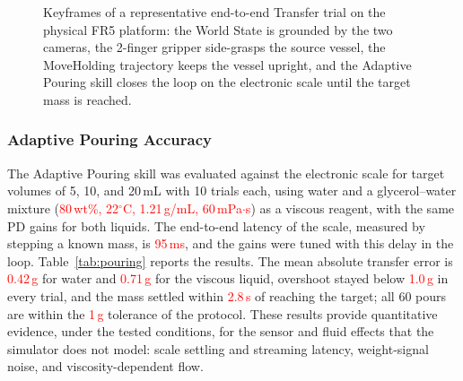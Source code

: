 \documentclass{ieeeaccess}
\newif\ifhighlight
\newcommand{\rev}[1]{\ifhighlight\hl{#1}\else#1\fi}
\newcommand{\nd}[1]{\textcolor{red}{#1}}
\newcommand{\revbox}[1]{\ifhighlight\noindent\colorbox{yellow}{\parbox{\dimexpr\linewidth-2\fboxsep\relax}{#1}}\else#1\fi}
\begin{document}
\begin{figure}[!t]
\centering
\revbox{%
\fbox{\parbox[c][0.26\linewidth][c]{\dimexpr\linewidth-2\fboxsep-2\fboxrule\relax}{\centering\nd{Figure placeholder: five keyframes of one physical Transfer trial on the FR5 (natural-language command, perception-grounded World State, SidePick, MoveHolding, adaptive pouring on the scale), to be captured during the hardware trials.}}}
\caption{Keyframes of a representative end-to-end Transfer trial on the physical FR5 platform: the World State is grounded by the two cameras, the 2-finger gripper side-grasps the source vessel, the MoveHolding trajectory keeps the vessel upright, and the Adaptive Pouring skill closes the loop on the electronic scale until the target mass is reached.}
\label{fig:hw}}
\end{figure}

\subsubsection{Adaptive Pouring Accuracy}\label{sec:4.6.3}
\rev{The Adaptive Pouring skill was evaluated against the electronic scale for target volumes of 5, 10, and 20\,mL with 10 trials each, using water and a glycerol--water mixture (\nd{80\,wt\%, 22$^\circ$C, 1.21\,g/mL, 60\,mPa$\cdot$s}) as a viscous reagent, with the same PD gains for both liquids.
The end-to-end latency of the scale, measured by stepping a known mass, is \nd{95\,ms}, and the gains were tuned with this delay in the loop.
Table~\ref{tab:pouring} reports the results.
The mean absolute transfer error is \nd{0.42\,g} for water and \nd{0.71\,g} for the viscous liquid, overshoot stayed below \nd{1.0\,g} in every trial, and the mass settled within \nd{2.8\,s} of reaching the target; all 60 pours are within the \nd{1\,g} tolerance of the protocol.
These results provide quantitative evidence, under the tested conditions, for the sensor and fluid effects that the simulator does not model: scale settling and streaming latency, weight-signal noise, and viscosity-dependent flow.}
\end{document}
